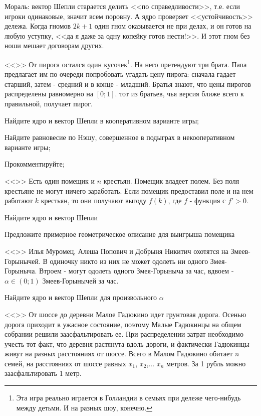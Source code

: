 Мораль: вектор Шепли старается делить <<по справедливости>>, т.е. если игроки одинаковые, значит всем поровну. А ядро проверяет <<устойчивость>> дележа. Когда гномов $2k+1$ один гном оказывается не при делах, и он готов на любую уступку, <<да я даже за одну копейку готов нести!>>. И этот гном без ноши мешает договорам других.


\vspace{5pt} <<>>
От пирога остался один кусочек\footnote{Эта игра реально играется в Голландии в семьях при дележе чего-нибудь между детьми. И на разных шоу, конечно.}. На него претендуют три брата. Папа предлагает им по очереди попробовать угадать цену пирога: сначала гадает старший, затем - средний и в конце - младший. Братья знают, что цены пирогов распределены равномерно на $[0;1]$. тот из братьев, чья версия ближе всего к правильной, получает пирог.

Найдите ядро и вектор Шепли в кооперативном варианте игры;


Найдите равновесие по Нэшу, совершенное в подыграх в некооперативном варианте игры;


Прокомментируйте;

\vspace{5pt} <<>>
Есть один помещик и $n$ крестьян. Помещик владеет полем. Без поля крестьяне не могут ничего заработать. Если помещик предоставил поле и на нем работают $k$ крестьян, то они получают выгоду $f(k)$, где $f$ - функция с $f'>0$. 

Найдите ядро и вектор Шепли

Предложите примерное геометрическое описание для выигрыша помещика


\vspace{5pt} <<>>
Илья Муромец, Алеша Попович и Добрыня Никитич охотятся на Змеев-Горынычей. В одиночку никто из них не может одолеть ни одного Змея-Горыныча. Втроем - могут одолеть одного Змея-Горыныча за час, вдвоем - $\alpha\in (0;1)$ Змеев-Горынычей за час.

Найдите ядро и вектор Шепли для произвольного $\alpha$

\vspace{5pt} <<>>
От шоссе до деревни Малое Гадюкино идет грунтовая дорога. Осенью дорога приходит в ужасное состояние, поэтому Малые Гадюкинцы на общем собрании решили заасфальтировать ее. При распределении затрат необходимо учесть тот факт, что деревня растянута вдоль дороги, и фактически Гадюкинцы живут на разных расстояниях от шоссе. Всего в Малом Гадюкино обитает  $n$  семей, на расстояниях от шоссе равных  $x_{1}$,  $x_{2}$,...  $x_{n}$ метров. За 1 рубль можно заасфальтировать 1 метр.


